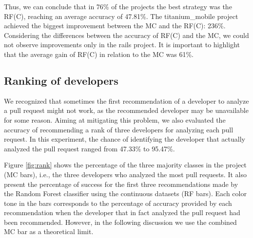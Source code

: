\documentclass{sig-alternate}
\begin{document}
Thus, we can conclude that in 76\% of the projects the best strategy was the RF(C), reaching an average accuracy of 47.81\%. The titanium\_mobile project achieved the biggest improvement between the MC and the RF(C): 236\%. Considering the differences between the accuracy of RF(C) and the MC, we could not observe improvements only in the rails project. It is important to highlight that the average gain of RF(C) in relation to the MC was 61\%.
\begin{figure*}
\centering
{}
\vspace{-0.8cm}
\caption{Ranking for assignment of developers.}\label{fig:rank}
\end{figure*}
\vspace{1cm}
\subsection{Ranking of developers}
We recognized that sometimes the first recommendation of a developer to analyze a pull request might not work, as the recommended developer may be unavailable for some reason. Aiming at mitigating this problem, we also evaluated the accuracy of recommending a rank of three developers for analyzing each pull request. In this experiment, the chance of identifying the developer that actually analyzed the pull request ranged from 47.33\% to 95.47\%.

Figure \ref{fig:rank} shows the percentage of the three majority classes in the project (MC bars), i.e., the three developers who analyzed the most pull requests. It also present the percentage of success for the first three recommendations made by the Random Forest classifier using the continuous datasets (RF bars). Each color tone in the bars corresponds to the percentage of accuracy provided by each recommendation when the developer that in fact analyzed the pull request had been recommended. 
However, in the following discussion we use the combined MC bar as a theoretical limit.
\end{document}
